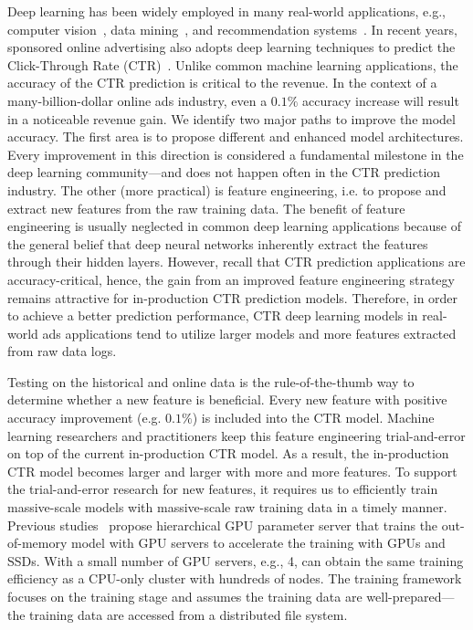 \documentclass[sigconf]{acmart}
\begin{document}
Deep learning has been widely employed in many real-world applications, e.g., computer vision~\cite{Proc:GAN_NIPS14,Proc:Resnet_CVPR16,CV_review18,DBLP:conf/iclr/DosovitskiyB0WZ21}, data mining~\cite{nguyen2019machine,DBLP:conf/kdd/KangCQ020,DBLP:conf/icde/LiLYWLWLZ21,DBLP:conf/kdd/MerhejBMR21,DBLP:conf/kdd/ZerveasJPBE21}, and recommendation systems~\cite{Proc:Covington_2016,Article:Wei_2017,cheng2016wide,zhang2019deep,DBLP:conf/kdd/MaNLD20}.  In recent years, sponsored online advertising also adopts deep learning techniques to predict the Click-Through Rate (CTR)~\cite{DBLP:conf/sigir/LiuXGTZHL20,DBLP:conf/acl/QiWWH20,DBLP:conf/cikm/ZhuLLLHCZ20,DBLP:conf/cikm/ShengZZDDLYLZDZ21,DBLP:conf/sigir/ZhaoLZQHZL21,DBLP:conf/wsdm/ZhangQCLLZMC21}. Unlike common machine learning applications, the accuracy of the CTR prediction is critical to the revenue. 
In the context of a many-billion-dollar online ads industry, even a $0.1\%$ accuracy increase will result in a noticeable revenue gain. 
We identify two major paths to improve the model accuracy. The first area is to propose different and enhanced model architectures. Every improvement in this direction is considered a fundamental milestone in the deep learning community---and does not happen often in the CTR prediction industry.
The other (more practical) is feature engineering, i.e. to propose and extract new features from the raw training data. The benefit of feature engineering is usually neglected in common deep learning applications because of the general belief that deep neural networks inherently extract the features through their hidden layers. However, recall that CTR prediction applications are accuracy-critical, hence, the gain from an improved feature engineering strategy remains attractive for in-production CTR prediction models. 
Therefore, in order to achieve a better prediction performance, CTR deep learning models in real-world ads applications tend to utilize larger models and more features extracted from raw data logs. 

Testing on the historical and online data is the rule-of-the-thumb way to determine whether a new feature is beneficial. Every new feature with positive accuracy improvement (e.g. $0.1\%$) is included into the CTR model. Machine learning researchers and practitioners keep this feature engineering trial-and-error on top of the current in-production CTR model. As a result, the in-production CTR model becomes larger and larger with more and more features. To support the trial-and-error research for new features, it requires us to efficiently train massive-scale models with massive-scale raw training data in a timely manner. Previous studies~\cite{Proc:Zhao_MLSys20} propose hierarchical GPU parameter server that trains the out-of-memory model with GPU servers to accelerate the training with GPUs and SSDs. With a small number of GPU servers, e.g., 4, can obtain the same training efficiency as a CPU-only cluster with hundreds of nodes. The training framework focuses on the training stage and assumes the training data are well-prepared---the training data are accessed from a distributed file system.
\end{document}
